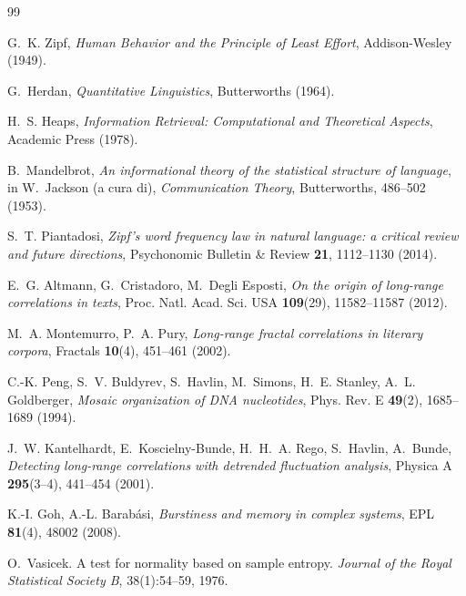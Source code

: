 \documentclass[12pt,a4paper,oneside]{report}
\begin{document}
\begin{thebibliography}{99}

G.~K. Zipf,
\emph{Human Behavior and the Principle of Least Effort},
Addison-Wesley (1949).

G.~Herdan,
\emph{Quantitative Linguistics},
Butterworths (1964).

H.~S. Heaps,
\emph{Information Retrieval: Computational and Theoretical Aspects},
Academic Press (1978).

B.~Mandelbrot,
\emph{An informational theory of the statistical structure of language},
in W.~Jackson (a cura di), \emph{Communication Theory}, Butterworths,
486--502 (1953).

S.~T. Piantadosi,
\emph{Zipf's word frequency law in natural language: a critical review and
future directions},
Psychonomic Bulletin \& Review \textbf{21}, 1112--1130 (2014).

E.~G. Altmann, G.~Cristadoro, M.~Degli Esposti,
\emph{On the origin of long-range correlations in texts},
Proc. Natl. Acad. Sci. USA \textbf{109}(29), 11582--11587 (2012).

M.~A. Montemurro, P.~A. Pury,
\emph{Long-range fractal correlations in literary corpora},
Fractals \textbf{10}(4), 451--461 (2002).

C.-K. Peng, S.~V. Buldyrev, S.~Havlin, M.~Simons, H.~E. Stanley,
A.~L. Goldberger,
\emph{Mosaic organization of DNA nucleotides},
Phys. Rev. E \textbf{49}(2), 1685--1689 (1994).

J.~W. Kantelhardt, E.~Koscielny-Bunde, H.~H.~A. Rego, S.~Havlin, A.~Bunde,
\emph{Detecting long-range correlations with detrended fluctuation analysis},
Physica A \textbf{295}(3--4), 441--454 (2001).

K.-I. Goh, A.-L. Barabási,
\emph{Burstiness and memory in complex systems},
EPL \textbf{81}(4), 48002 (2008).

O.~Vasicek.
\newblock A test for normality based on sample entropy.
\newblock \emph{Journal of the Royal Statistical Society B}, 38(1):54--59, 1976.


\end{thebibliography}
\end{document}
